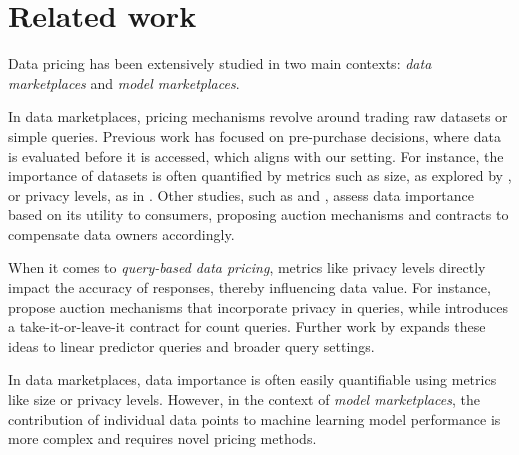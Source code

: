 \section{Related work}
Data pricing has been extensively studied in two main contexts: {\em data marketplaces} and {\em model marketplaces}. %


In data marketplaces, pricing mechanisms revolve around trading raw datasets or simple queries. Previous work has focused on pre-purchase decisions, where data is evaluated before it is accessed, which aligns with our setting. For instance, the importance of datasets is often quantified by metrics such as size, as explored by \cite{kushal2012pricing}, or privacy levels, as in \cite{parra2018optimized}. Other studies, such as \cite{xu2015privacy} and \cite{jaisingh2008privacy}, assess data importance based on its utility to consumers, proposing auction mechanisms and contracts to compensate data owners accordingly.

When it comes to \emph{query-based data pricing}, metrics like privacy levels directly impact the accuracy of responses, thereby influencing data value.
For instance, \cite{ghosh2011selling,roth2012conducting} propose auction mechanisms that incorporate privacy in queries, while \cite{ligett2012take} introduces a take-it-or-leave-it contract for count queries. Further work by \cite{dandekar2012privacy,zhang2020selling} expands these ideas to linear predictor queries and broader query settings.

In data marketplaces, data importance is often easily quantifiable using metrics like size or privacy levels. However, in the context of \emph{model marketplaces}, the contribution of individual data points to machine learning model performance is more complex and requires novel pricing methods.


